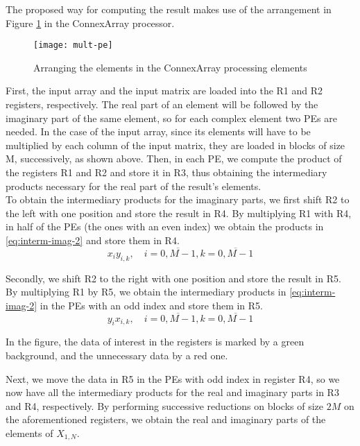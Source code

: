 The proposed way for computing the result makes use of the arrangement in
Figure \ref{fig:mult-pe} in the ConnexArray processor.
\begin{figure}[H]
    \centering
    \texttt{[image: mult-pe]}
    \caption{Arranging the elements in the ConnexArray processing elements}
    \label{fig:mult-pe}
\end{figure}

First, the input array and the input matrix are loaded into the R1 and R2
registers, respectively. The real part of an element will be followed by the
imaginary part of the same element, so for each complex element two PEs are
needed. In the case of the input array, since its elements will have to be
multiplied by each column of the input matrix, they are loaded in blocks of size
M, successively, as shown above. Then, in each PE, we compute the product of the
registers R1 and R2 and store it in R3, thus obtaining the intermediary products
necessary for the real part of the result's elements. \\

To obtain the intermediary products for the imaginary parts, we first shift R2
to the left with one position and store the result in R4. By multiplying R1 with
R4, in half of the PEs (the ones with an even index) we obtain the products in
\eqref{eq:interm-imag-2} and store them in R4.
\begin{equation}
x_iy_{i,k}, \quad i = \overline{0, M-1}, k = \overline{0, M-1}
\label{eq:interm-imag-1}
\end{equation}

Secondly, we shift R2 to the right with one position and store the result in R5.
By multiplying R1 by R5, we obtain the intermediary products in
\eqref{eq:interm-imag-2} in the PEs with an odd index and store them in R5.
\begin{equation}
y_ix_{i,k}, \quad i = \overline{0, M-1}, k = \overline{0,M-1}
\label{eq:interm-imag-2}
\end{equation}

In the figure, the data of interest in the registers is marked by a green
background, and the unnecessary data by a red one.

Next, we move the data in R5 in the PEs with odd index in register R4, so we now
have all the intermediary products for the real and imaginary parts in R3 and
R4, respectively. By performing successive reductions on blocks of size $2M$ on
the aforementioned registers, we obtain the real and imaginary parts of the
elements of $X_{1,N}$. \\

